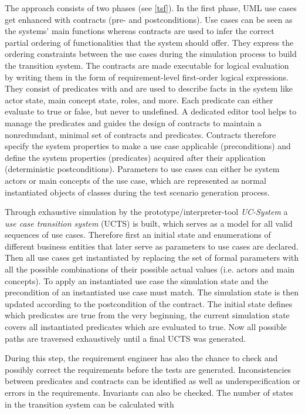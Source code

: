 The approach consists of two phases (see \autoref{tsf}). In the first phase, UML use cases get enhanced with contracts (pre- and postconditions). Use cases can be seen as the systems' main functions whereas contracts are used to infer the correct partial ordering of functionalities that the system should offer. They express the ordering constraints between the use cases during the simulation process to build the transition system. The contracts are made executable for logical evaluation by writing them in the form of requirement-level first-order logical expressions. They consist of predicates with and are used to describe facts in the system like actor state, main concept state, roles, and more. Each predicate can either evaluate to true or false, but never to undefined. A dedicated editor tool helps to manage the predicates and guides the design of contracts to maintain a nonredundant, minimal set of contracts and predicates. Contracts therefore specify the system properties to make a use case applicable (preconditions) and define the system properties (predicates) acquired after their application (deterministic postconditions). Parameters to use cases can either be system actors or main concepts of the use case, which are represented as normal instantiated objects of classes during the test scenario generation process. 

Through exhaustive simulation by the prototype/interpreter-tool \textit{UC-System} a \textit{use case transition system} (UCTS) is built, which serves as a model for all valid sequences of use cases. Therefore first an initial state and enumerations of different business entities that later serve as parameters to use cases are declared. Then all use cases get instantiated by replacing the set of formal parameters with all the possible combinations of their possible actual values (i.e. actors and main concepts). To apply an instantiated use case the simulation state and the precondition of an instantiated use case must match. The simulation state is then updated according to the postcondition of the contract. The initial state defines which predicates are true from the very beginning, the current simulation state covers all instantiated predicates which are evaluated to true. Now all possible paths are traversed exhaustively until a final UCTS was generated. 

During this step, the requirement engineer has also the chance to check and possibly correct the requirements before the tests are generated. Inconsistencies between predicates and contracts can be identified as well as underspecification or errors in the requirements. Invariants can also be checked. The number of states in the transition system can be calculated with

